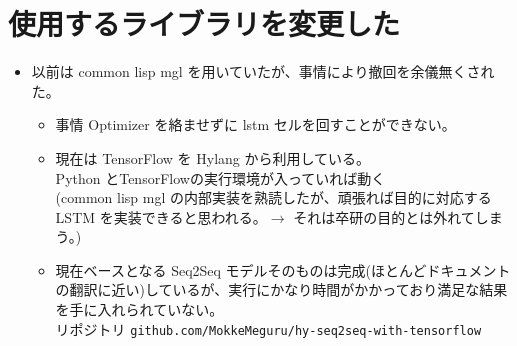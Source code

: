 \documentclass[dvipdfmx,10pt,presentation]{beamer}
\begin{document}
\section{使用するライブラリを変更した}
\label{sec:org4370960}
\begin{frame}{}
 \begin{itemize}
\item 以前は common lisp mgl を用いていたが、事情により撤回を余儀無くされた。\\
\begin{itemize}
\item 事情 Optimizer を絡ませずに lstm セルを回すことができない。\\
\end{itemize}
\begin{itemize}
\item 現在は TensorFlow を Hylang から利用している。\\
Python とTensorFlowの実行環境が入っていれば動く\\
(common lisp mgl の内部実装を熟読したが、頑張れば目的に対応する LSTM を実装できると思われる。\(\rightarrow\) それは卒研の目的とは外れてしまう。)\\
\item 現在ベースとなる Seq2Seq モデルそのものは完成(ほとんどドキュメントの翻訳に近い)しているが、実行にかなり時間がかかっており満足な結果を手に入れられていない。\\
リポジトリ \texttt{github.com/MokkeMeguru/hy-seq2seq-with-tensorflow}\\
\end{itemize}
\end{itemize}
\end{frame}
\end{document}
